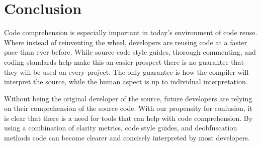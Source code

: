 \section{Conclusion}\label{sec-conclude}
Code comprehension is especially important in today’s environment of code reuse. Where instead of reinventing the wheel, developers are reusing code at a faster pace than ever before. While source code style guides, 
thorough commenting, and coding standards help make this an easier prospect there is no guarantee that they will be used on every project. The only guarantee is how the compiler will interpret the source, while the
human aspect is up to individual interpretation.

 Without being the original developer of the source,
future developers are relying on their comprehension of the source code. With our propensity for confusion, it is clear that there is a need for tools that can help with code comprehension. By using a combination of clarity metrics, code style guides, and deobfuscation methods code can become clearer and concisely interpreted by most developers. 
